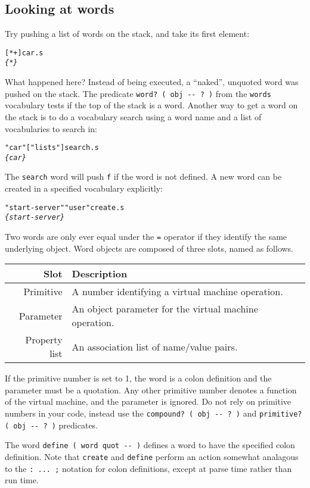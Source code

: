 \documentclass[english]{article}
\providecommand{\tabularnewline}{\\}
\begin{document}
\subsection{Looking at words}

Try pushing a list of words on the stack, and take its first element:

\begin{alltt}
{[} * + {]} car .s
\emph{\{ * \}}
\end{alltt}

What happened here? Instead of being executed, a ``naked'', unquoted word was pushed on the stack. The predicate \texttt{word? ( obj -{}- ? )} from the \texttt{words} vocabulary tests if the top of the stack is a word. Another way to get a word on the stack is to do a vocabulary search using a word name and a list of vocabularies to search in:

\begin{alltt}
"car" {[} "lists" {]} search .s
\emph{\{ car \}}
\end{alltt}

The \texttt{search} word will push \texttt{f} if the word is not defined. A new word can be created in a specified vocabulary explicitly:

\begin{alltt}
"start-server" "user" create .s
\emph{\{ start-server \}}
\end{alltt}

Two words are only ever equal under the \texttt{=} operator if they identify the same underlying object. Word objects are composed of three slots, named as follows.

\begin{tabular}{|r|l|}
\hline 
Slot&
Description\tabularnewline
\hline
\hline 
Primitive&
A number identifying a virtual machine operation.\tabularnewline
\hline 
Parameter&
An object parameter for the virtual machine operation.\tabularnewline
\hline 
Property list&
An association list of name/value pairs.\tabularnewline
\hline
\end{tabular}

If the primitive number is set to 1, the word is a colon definition and the parameter must be a quotation. Any other primitive number denotes a function of the virtual machine, and the parameter is ignored. Do not rely on primitive numbers in your code, instead use the \texttt{compound? ( obj -{}- ? )} and \texttt{primitive? ( obj -{}- ? )} predicates.

The word \texttt{define ( word quot -{}- )} defines a word to have the specified colon definition. Note that \texttt{create} and  \texttt{define} perform an action somewhat analagous to the \texttt{: ... ;} notation for colon definitions, except at parse time rather than run time.
\end{document}
